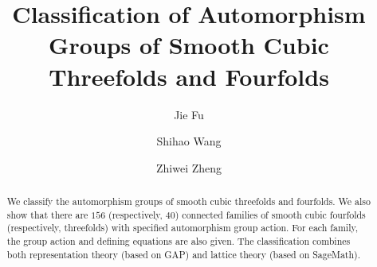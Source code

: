 \documentclass[12pt]{amsart}
\title{Classification of Automorphism Groups of Smooth Cubic Threefolds and Fourfolds}
\author[J. Fu]{Jie Fu}
\author[S. Wang]{Shihao Wang}
\author[Z. Zheng]{Zhiwei Zheng}
\date{}
\numberwithin{equation}{section}
\theoremstyle{plain}
\theoremstyle{definition}
\theoremstyle{remark}
\begin{document}
\raggedbottom
\allowdisplaybreaks[4]


\begin{abstract}
We classify the automorphism groups of smooth cubic threefolds and fourfolds. We also show that there are $156$ (respectively, $40$) connected families of smooth cubic fourfolds (respectively, threefolds) with specified automorphism group action. For each family, the group action and defining equations are also given. The classification combines both representation theory (based on GAP) and lattice theory (based on SageMath).
\end{abstract} 

\maketitle
\setcounter{tocdepth}{1}
\tableofcontents
\end{document}
